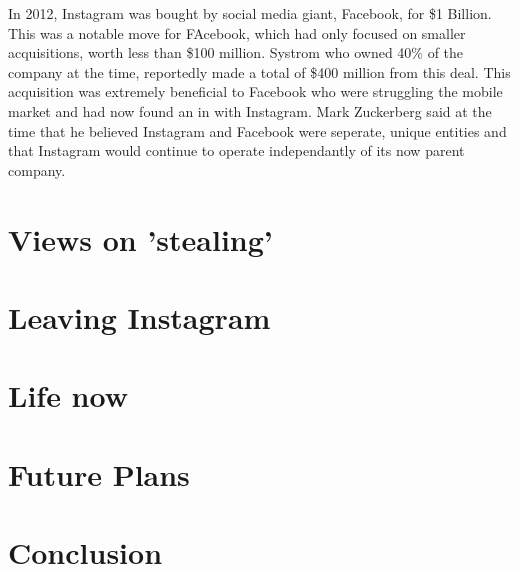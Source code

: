 \documentclass[12pt]{article}
\begin{document}
    In 2012, Instagram was bought by social media giant, Facebook, for \$1 Billion. This was a notable move for FAcebook, which had only focused on smaller acquisitions,
    worth less than \$100 million.
    Systrom who owned 40\% of the company at the time,
    reportedly made a total of \$400 million from this deal. This acquisition was extremely beneficial to Facebook who were 
    struggling the mobile market and had now found an in with Instagram. 
    Mark Zuckerberg said at the time that he believed Instagram and Facebook were seperate, unique entities 
    and that Instagram would continue to operate independantly of its now parent company.
    \section{Views on 'stealing'}
    \section{Leaving Instagram}
    \section{Life now}
    \section{Future Plans}

    \section{Conclusion}
    \newpage
\end{document}
